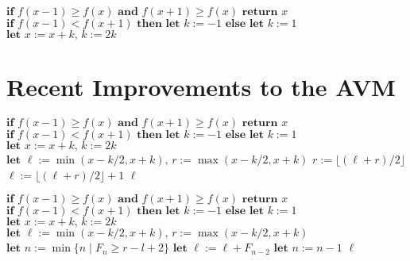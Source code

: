 \documentclass{llncs}
\begin{document}
\begin{algorithm}
	\small
	\caption{$\text{Iterated Pattern Search, starting at }x\in D$}
	\begin{algorithmic}[1]
			\STATE$\textbf{if }f(x-1)\geq f(x)\textbf{ and }f(x+1)\geq f(x)\textbf{ return }x$
			\STATE$\textbf{if }f(x-1)<f(x+1)\textbf{ then let }k:=-1\textbf{ else let }k:=1$
				\STATE$\textbf{let }x:=x+k\text{, }k:=2k$
			\ENDWHILE
		\ENDWHILE
	\end{algorithmic}
	\vspace*{1mm}
	\label{alg:one-dimensional-AVM}
\end{algorithm}

\section{Recent Improvements to the AVM}

\begin{algorithm}
	\small
	\caption{$\text{Geometric search, starting at }x\in D$}
	\begin{algorithmic}[1]
		\STATE$\textbf{if }f(x-1)\geq f(x)\textbf{ and }f(x+1)\geq f(x)\textbf{ return }x$
		\STATE$\textbf{if }f(x-1)<f(x+1)\textbf{ then let }k:=-1\textbf{ else let }k:=1$
			\STATE$\textbf{let }x:=x+k\text{, }k:=2k$
		\ENDWHILE
		\STATE$\textbf{let }\ell:=\min(x-k/2,x+k)\text{, }r:=\max(x-k/2,x+k)$
				\STATE$r:=\lfloor(\ell+r)/2\rfloor$
			\ELSE
				\STATE$\ell:=\lfloor(\ell+r)/2\rfloor+1$
			\ENDIF
		\ENDWHILE
		\RETURN$\ell$
	\end{algorithmic}
	\vspace*{1mm}
	\label{alg:one-dimensional-geometric}
\end{algorithm}


\begin{algorithm}
	\small
	\caption{$\text{Lattice search, starting at }x\in D$}
	\begin{algorithmic}[1]
		\STATE$\textbf{if }f(x-1)\geq f(x)\textbf{ and }f(x+1)\geq f(x)\textbf{ return }x$
		\STATE$\textbf{if }f(x-1)<f(x+1)\textbf{ then let }k:=-1\textbf{ else let }k:=1$
			\STATE$\textbf{let }x:=x+k\text{, }k:=2k$
		\ENDWHILE
		\STATE$\textbf{let }\ell:=\min(x-k/2,x+k)\text{, }r:=\max(x-k/2,x+k)$
		\STATE$\textbf{let }n:=\min\{n\mid F_{n}\geq r-l+2\}$
				\STATE$\textbf{let }\ell:=\ell+F_{n-2}$
			\ENDIF
			\STATE$\textbf{let }n:=n-1$
		\ENDWHILE
		\RETURN$\ell$
	\end{algorithmic}
	\vspace*{1mm}
	\label{alg:one-dimensional-lattice}
\end{algorithm}
\end{document}
